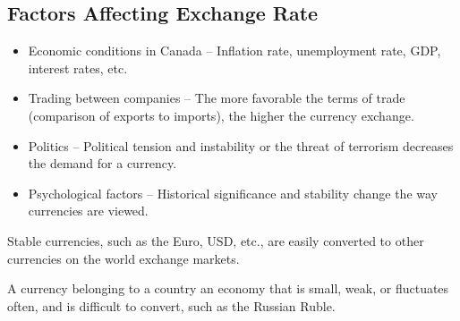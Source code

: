 \subsection{Factors Affecting Exchange Rate}
\begin{itemize}
    \item Economic conditions in Canada -- Inflation rate, unemployment rate, GDP, interest rates, etc.
    \item Trading between companies -- The more favorable the terms of trade (comparison of exports to imports), the higher the currency exchange.
    \item Politics -- Political tension and instability or the threat of terrorism decreases the demand for a currency.
    \item Psychological factors -- Historical significance and stability change the way currencies are viewed.
\end{itemize}

\begin{definition}
    Stable currencies, such as the Euro, USD, etc., are easily converted to other currencies on the world exchange markets.
\end{definition}

\begin{definition}
    A currency belonging to a country an economy that is small, weak, or fluctuates often, and is difficult to convert, such as the Russian Ruble.
\end{definition}